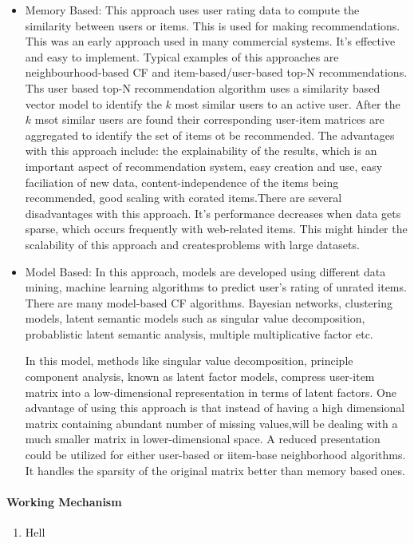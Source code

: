 \begin{itemize}
	\item Memory Based:
		This approach uses user rating data to compute the similarity between users or items. This is used for making recommendations. This was an early approach used in many commercial systems. It's effective and easy to implement. Typical examples of this approaches are neighbourhood-based CF and item-based/user-based top-N recommendations. Ths user based top-N recommendation algorithm uses a similarity based vector model to identify the $k$ most similar users to an active user. After the $k$ msot similar users are found their corresponding user-item matrices are aggregated to identify the set of items ot be recommended.
The advantages with this approach include: the explainability of the results, which is an important aspect of recommendation system, easy creation and use, easy faciliation of new data, content-independence of the items being recommended, good scaling with corated items.There are several disadvantages with this approach. It's performance decreases when data gets sparse, which occurs frequently with web-related items. This might hinder the scalability of this approach and createsproblems with large datasets.

\item Model Based:
	In this approach, models are developed using different data mining, machine learning algorithms to predict user's rating of unrated items. There are many model-based CF algorithms. Bayesian networks, clustering models, latent semantic models such as singular value decomposition, probablistic latent semantic analysis, multiple multiplicative factor etc.

In this model, methods like singular value decomposition, principle component analysis, known as latent factor models, compress user-item matrix into a low-dimensional representation in terms of latent factors. One advantage of using this approach is that instead of having a high dimensional matrix containing abundant number of missing values,will be dealing with a much smaller matrix in lower-dimensional space. A reduced presentation could be utilized for either user-based or iitem-base neighborhood algorithms. It handles the sparsity of the original matrix better than memory based ones.
\end{itemize}
\paragraph{Working Mechanism}\hfill
\begin{enumerate}
	\item Hell
\end{enumerate}
